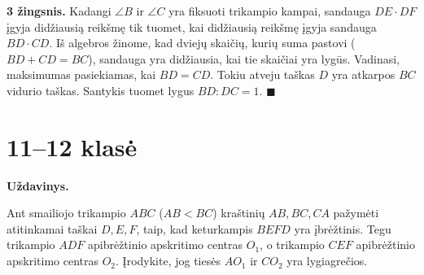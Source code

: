 \documentclass[11pt, a4paper]{scrreprt}
\newenvironment{problem}
    {\par\medskip\noindent\textbf{Uždavinys.}\par\smallskip}
    {\par\medskip}
\begin{document}
\begin{center}
\end{center}

\textbf{3 žingsnis.} Kadangi $\angle B$ ir $\angle C$ yra fiksuoti trikampio kampai, sandauga $DE \cdot DF$ įgyja didžiausią reikšmę tik tuomet, kai didžiausią reikšmę įgyja sandauga $BD \cdot CD$.
Iš algebros žinome, kad dviejų skaičių, kurių suma pastovi ($BD + CD = BC$), sandauga yra didžiausia, kai tie skaičiai yra lygūs. 
Vadinasi, maksimumas pasiekiamas, kai $BD = CD$. Tokiu atveju taškas $D$ yra atkarpos $BC$ vidurio taškas.
Santykis tuomet lygus $BD : DC = 1$. \hfill $\blacksquare$

\vspace{1cm}

\section*{11--12 klasė}

\begin{problem}
Ant smailiojo trikampio $ABC$ ($AB < BC$) kraštinių $AB, BC, CA$ pažymėti atitinkamai taškai $D, E, F$, taip, kad keturkampis $BEFD$ yra įbrėžtinis. Tegu trikampio $ADF$ apibrėžtinio apskritimo centras $O_1$, o trikampio $CEF$ apibrėžtinio apskritimo centras $O_2$. Įrodykite, jog tiesės $AO_1$ ir $CO_2$ yra lygiagrečios.
\end{problem}
\end{document}
